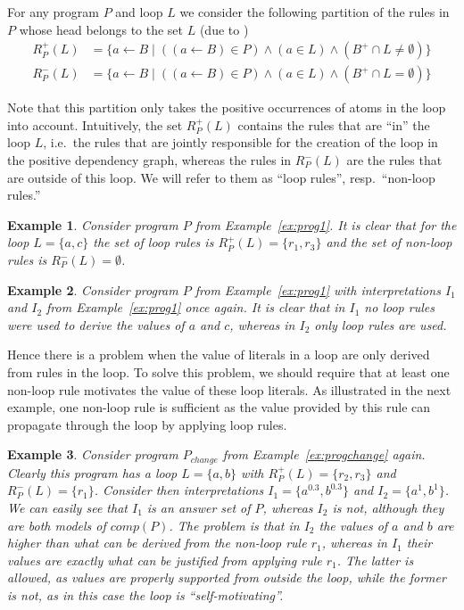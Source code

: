 \documentclass{tlp}
\newcommand{\comp}[1]{\ensuremath{comp(#1)}}
\newcommand{\looprules}[2]{R^{+}_{#1}(#2)}
\newcommand{\nonlooprules}[2]{R^{-}_{#1}(#2)}
\newtheorem{example}{Example}
\begin{document}
For any program $P$ and loop $L$ we consider the following partition of the rules in $P$ whose head belongs to the set $L$ (due to \cite{assat-linzhao})
 \begin{eqnarray}
  \looprules{P}{L} &= \{ a \gets B \mid ((a \gets B) \in P) \wedge (a \in L) \wedge (B^+ \cap L \neq \emptyset) \}\\
  \nonlooprules{P}{L} &= \{ a \gets B \mid ((a \gets B) \in P) \wedge (a \in L) \wedge (B^+ \cap L = \emptyset) \}
 \end{eqnarray}

Note that this partition only takes the positive occurrences of atoms in the loop into account.
Intuitively, the set $\looprules{P}{L}$ contains the rules that are ``in'' the loop $L$, i.e.~the rules that are jointly responsible for the creation of the loop in the positive dependency graph, whereas the rules in $\nonlooprules{P}{L}$ are the rules that are outside of this loop. We will refer to them as ``loop rules'', resp.~``non-loop rules.''

\begin{example}
Consider program $P$ from Example~\ref{ex:prog1}. It is clear that for the loop $L = \{a,c\}$ the set of loop rules is $\looprules{P}{L} = \{ r_{1},r_{3} \}$ and the set of non-loop rules is $\nonlooprules{P}{L} = \emptyset$.
\end{example}



\begin{example}
Consider program $P$ from Example~\ref{ex:prog1} with interpretations $I_{1}$ and $I_{2}$ from Example~\ref{ex:prog1} once again. 
It is clear that in $I_1$ no loop rules were used to derive the values of $a$ and $c$, whereas in $I_2$ only loop rules are used. 
\end{example}



Hence there is a problem when the value of literals in a loop are only derived from rules in the loop. To solve this problem, we should require that at least one non-loop rule motivates the value of these loop literals. As illustrated in the next example, one non-loop rule is sufficient as the value provided by this rule can propagate through the loop by applying loop rules.

\begin{example}\label{ex:prog2}
 Consider program $P_{change}$ from Example~\ref{ex:progchange} again.
 Clearly this program has a loop $L = \{ a, b \}$ with $\looprules{P}{L} = \{ r_{2}, r_{3} \}$ and $\nonlooprules{P}{L} = \{ r_{1} \}$. Consider then interpretations $I_{1} = \{ a^{0.3}, b^{0.3} \}$ and $I_{2} = \{ a^{1}, b^{1} \}$. We can easily see that $I_{1}$ is an answer set of $P$, whereas $I_{2}$ is not, although they are both models of $\comp{P}$. The problem is that in $I_{2}$ the values of $a$ and $b$ are higher than what can be derived from the non-loop rule $r_1$, whereas in $I_1$ their values are exactly what can be justified from applying rule $r_1$.
 The latter is allowed, as values are properly supported from outside the loop, while the former is not, as in this case the loop is ``self-motivating''.
\end{example}
\end{document}
